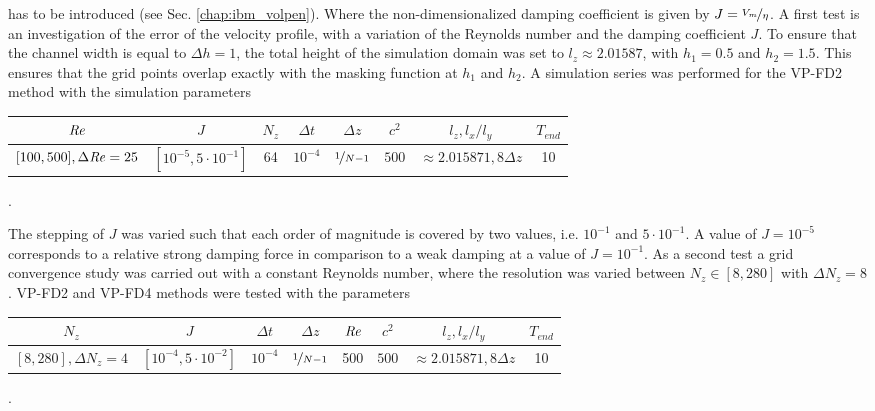 has to be introduced (see Sec. \ref{chap:ibm_volpen}).
Where the non-dimensionalized damping coefficient is given by $J = \nicefrac{V_{m}}{\eta}$.
A first test is an investigation of the error of the velocity profile, with a variation of the Reynolds number and the damping coefficient $J$.
To ensure that the channel width is equal to $\Delta h = 1$, the total height of the simulation domain was set to $l_z\approx2.01587$,
with $h_1=0.5$ and $h_2=1.5$.
This ensures that the grid points overlap exactly with the masking function at $h_1$ and $h_2$.
A simulation series was performed for the VP-FD2 method with the simulation parameters

\begin{center}
\vspace*{0.5ex}
\begin{tabular}{c|c|c|c|c|c|c|c }
 $ \mbox{\textit{Re}}  $                      & $J$ & $N_z$ &  $\Delta t$ & $\Delta z$            & $c^2$   & $l_z, l_x/l_y$ & $T_{end}$\\
\hline
 $[100, 500], \Delta \mbox{\textit{Re}} = 25 $& $[10^{-5}, 5\cdot10^{-1}]  $ & 64 &  $10^{-4}$ & $\nicefrac{1}{N - 1}$   & $500$   & $\approx{2.015871}, 8\Delta z$ & 10\\
\end{tabular}.
\vspace*{0.5ex}
\end{center}

The stepping of $J$ was varied such that each order of magnitude is covered by two values, i.e. $10^{-1}$ and $5\cdot10^{-1}$.
A value of $J=10^{-5}$ corresponds to a relative strong damping force in comparison to a weak damping at a value of $J=10^{-1}$.
As a second test a grid convergence study was carried out with a constant Reynolds number,
where the resolution was varied between $N_z\in [8, 280]$ with $\Delta N_z = 8$. VP-FD2 and VP-FD4 methods were tested with the parameters

\begin{center}
\vspace*{0.5ex}
\begin{tabular}{c|c|c|c|c|c|c|c }
 $ N_z  $                      & $J$ &  $\Delta t$ & $\Delta z$            & $\mbox{\textit{Re}}$  & $c^2$   & $l_z, l_x/l_y$ & $T_{end}$\\
\hline
 $[8, 280], \Delta N_z = 4 $& $[10^{-4}, 5\cdot10^{-2}]  $ &  $10^{-4}$ & $\nicefrac{1}{N - 1}$ & 500     & $500$   & $\approx{2.015871}, 8\Delta z$  & 10\\
\end{tabular}.
\vspace*{0.5ex}
\end{center}

